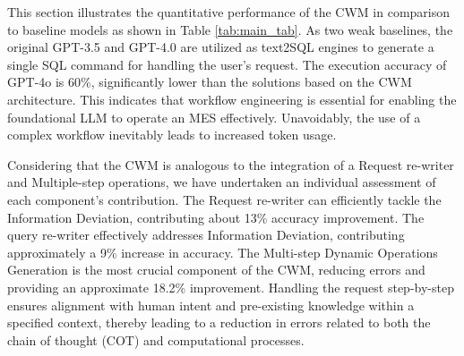 \documentclass[preprint,12pt]{elsarticle}
\begin{document}
This section illustrates the quantitative performance of the CWM in comparison to baseline models as shown in Table \ref{tab:main_tab}.%
As two weak baselines, the original GPT-3.5 and GPT-4.0 are utilized as text2SQL engines to generate a single SQL command for handling the user's request.
The execution accuracy of GPT-4o is 60\%, significantly lower than the solutions based on the CWM architecture. 
This indicates that workflow engineering is essential for enabling the foundational LLM to operate an MES effectively.
Unavoidably, the use of a complex workflow inevitably leads to increased token usage.

Considering that the CWM is analogous to the integration of a Request re-writer and Multiple-step operations, we have undertaken an individual assessment of each component's contribution.
The Request re-writer can efficiently tackle the Information Deviation, contributing about 13\% accuracy improvement.
The query re-writer effectively addresses Information Deviation, contributing approximately a 9\% increase in accuracy. 
The Multi-step Dynamic Operations Generation is the most crucial component of the CWM, reducing errors and providing an approximate 18.2\% improvement. 
Handling the request step-by-step ensures alignment with human intent and pre-existing knowledge within a specified context, thereby leading to a reduction in errors related to both the chain of thought (COT) and computational processes.
\end{document}
